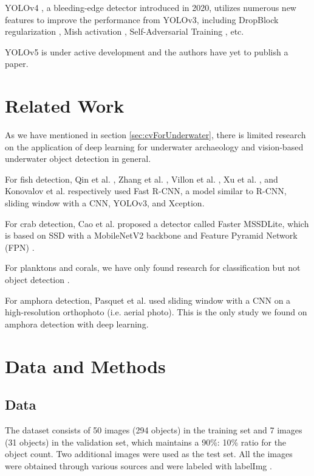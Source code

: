 \documentclass[a4paper, 11pt, oneside]{article}
\begin{document}
YOLOv4 \cite{bochkovskiy2020yolov4}, a bleeding-edge detector introduced in 2020, utilizes numerous new features to
improve the performance from YOLOv3, including DropBlock regularization \cite{ghiasi2018dropblock}, Mish activation
\cite{misra2019mish}, Self-Adversarial Training \cite{bochkovskiy2020yolov4}, etc.

YOLOv5 \cite{yolov5} is under active development and the authors have yet to publish a paper.

\section{Related Work}

As we have mentioned in section \ref{sec:cvForUnderwater}, there is limited research on the application of deep learning
for underwater archaeology and vision-based underwater object detection in general.

For fish detection, Qin et al. \cite{qin2015underwater, li2015fast}, Zhang et al. \cite{zhang2016unsupervised},
Villon et al. \cite{villon2016coral}, Xu et al. \cite{xu2018underwater}, and Konovalov et al.
\cite{konovalov2019underwater} respectively used Fast R-CNN, a model similar to R-CNN, sliding window with a CNN,
YOLOv3, and Xception.

For crab detection, Cao et al. \cite{cao2020real} proposed a detector called Faster MSSDLite, which is based on SSD with
a MobileNetV2 backbone and Feature Pyramid Network (FPN) \cite{lin2017feature}.

For planktons and corals, we have only found research for classification but not object detection
\cite{qin2015underwater, moniruzzaman2017deep}.

For amphora detection, Pasquet et al. \cite{mccarthy20193d, pasquet2017amphora} used sliding window with a CNN on a
high-resolution orthophoto (i.e. aerial photo). This is the only study we found on amphora detection with deep learning.

\section{Data and Methods}

\subsection{Data}

The dataset consists of 50 images (294 objects) in the training set and 7 images (31 objects) in the validation set,
which maintains a 90\%: 10\% ratio for the object count. Two additional images were used as the test set. All the
images were obtained through various sources
\cite{googleimages, scuba, itinari, whoi, phoenician, auscape, hakai, groplan, ionian, sanisera} and were labeled
with labelImg \cite{labelimg}.
\end{document}
